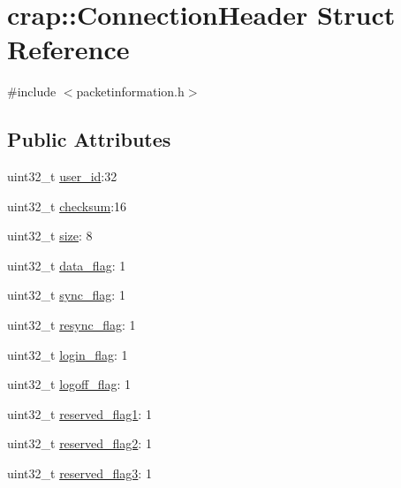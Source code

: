 \hypertarget{structcrap_1_1_connection_header}{}\section{crap\+:\+:Connection\+Header Struct Reference}
\label{structcrap_1_1_connection_header}


{\ttfamily \#include $<$packetinformation.\+h$>$}

\subsection*{Public Attributes}
\begin{DoxyCompactItemize}
\item 
uint32\+\_\+t \hyperlink{structcrap_1_1_connection_header_a034507ceab327eb570a50ae9ccc86924}{user\+\_\+id}\+:32
\item 
uint32\+\_\+t \hyperlink{structcrap_1_1_connection_header_ac75670d52163a19d001a9477041210e6}{checksum}\+:16
\item 
uint32\+\_\+t \hyperlink{structcrap_1_1_connection_header_adc2102490c7feea9156acca68f2c6d9b}{size}\+: 8
\item 
uint32\+\_\+t \hyperlink{structcrap_1_1_connection_header_af2c86c787276c6e0afb47229e4f27f49}{data\+\_\+flag}\+: 1
\item 
uint32\+\_\+t \hyperlink{structcrap_1_1_connection_header_ad94b49aadea4064934e48d57bb3edc56}{sync\+\_\+flag}\+: 1
\item 
uint32\+\_\+t \hyperlink{structcrap_1_1_connection_header_a5041797ac0ddf2e6518f97679c8bd8d2}{resync\+\_\+flag}\+: 1
\item 
uint32\+\_\+t \hyperlink{structcrap_1_1_connection_header_a1916d0f7ec6cdfccb2268d9dcee6409e}{login\+\_\+flag}\+: 1
\item 
uint32\+\_\+t \hyperlink{structcrap_1_1_connection_header_ab62a0376a8ab247dfa670d7769dc3307}{logoff\+\_\+flag}\+: 1
\item 
uint32\+\_\+t \hyperlink{structcrap_1_1_connection_header_a9f3b8f11cda04679b59cc0cc38bf4326}{reserved\+\_\+flag1}\+: 1
\item 
uint32\+\_\+t \hyperlink{structcrap_1_1_connection_header_ade56dffd3ec8971d9900a546bb5b6975}{reserved\+\_\+flag2}\+: 1
\item 
uint32\+\_\+t \hyperlink{structcrap_1_1_connection_header_a2dd3b6067b35376ec4c9e272d507ca1e}{reserved\+\_\+flag3}\+: 1
\end{DoxyCompactItemize}



